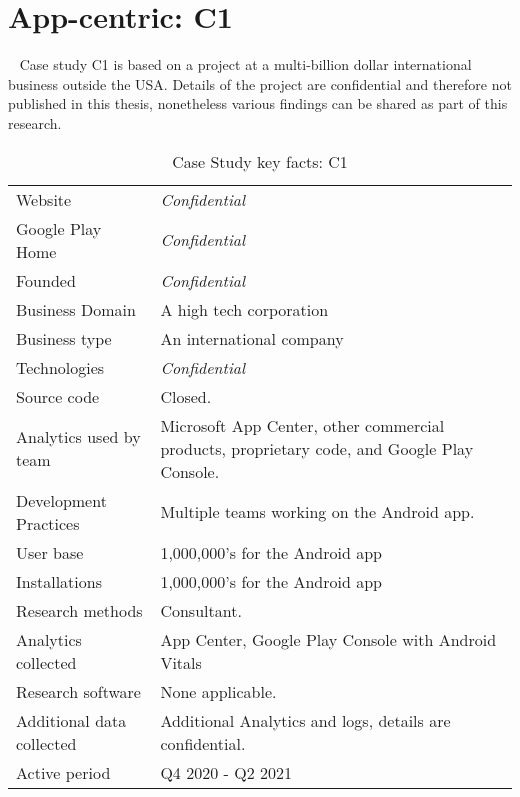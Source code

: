 \section{App-centric: C1}~\label{case-study-overview-C1}
Case study C1 is based on a project at a multi-billion dollar international business outside the USA. Details of the project are confidential and therefore not published in this thesis, nonetheless various findings can be shared as part of this research. 

{\renewcommand{\arraystretch}{0.8}%
\begin{table*}
    \centering
    \small
    \setlength{\tabcolsep}{6pt}
    \begin{tabular}{lp{9cm}}
       \toprule
       Website &\textit{Confidential} \\
       Google Play Home & \textit{Confidential} \\
       Founded & \textit{Confidential} \\
       Business Domain & A high tech corporation \\
       Business type & An international company \\
       Technologies  & \textit{Confidential} \\
       Source code  &Closed. \\
       Analytics used by team & Microsoft App Center, other commercial products, proprietary code, and Google Play Console. \\
       Development Practices & Multiple teams working on the Android app. \\
       \midrule
       User base & 1,000,000's for the Android app \\
       Installations & 1,000,000's for the Android app \\
       \midrule
       Research methods &Consultant. \\
       Analytics collected &App Center, Google Play Console with Android Vitals \\
       Research software & None applicable. \\
       Additional data collected &Additional Analytics and logs, details are confidential. \\
       Active period & Q4 2020 - Q2 2021 \\
       \bottomrule
    \end{tabular}
    \caption{Case Study key facts: C1}
    \label{tab:blank_case_study_anaytics_overview}
\end{table*}
}

